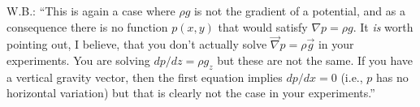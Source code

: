 W.B.: ``This is again a case where $\rho g$ is not the gradient of a potential, 
and as a consequence there is no function $p(x,y)$ that would satisfy $\nabla p = \rho g$.
It {\it is} worth pointing out, I believe, that you don't actually solve
$\vec\nabla p = \rho \vec{g}$ in your experiments. You are solving $dp/dz = \rho g_z$
but these are not the same. If you have a vertical gravity vector, then the first equation 
implies $dp/dx=0$ (i.e., $p$ has no horizontal variation) but that is clearly not the case in your experiments.''
 








